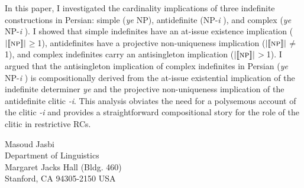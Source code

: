 \documentclass{salt}
\begin{document}
In this paper, I investigated the cardinality implications of three indefinite constructions in Persian: simple (\emph{ye} NP), antidefinite (NP-\emph{i} ), and complex (\emph{ye} NP-\emph{i} ). I showed that simple indefinites have an at-issue existence implication ($| \llbracket \textsc{np} \rrbracket |$$\geq$1), antidefinites have a projective non-uniqueness implication ($| \llbracket \textsc{np} \rrbracket |$$\not=$1), and complex indefinites carry an antisingleton implication ($| \llbracket \textsc{np} \rrbracket |$$>$1). I argued that the antisingleton implication of complex indefinites in Persian (\emph{ye} NP-\emph{i} ) is compositionally derived from the at-issue existential implication of the indefinite determiner \emph{ye} and the projective non-uniqueness implication of the antidefinite clitic \emph{-i}. This analysis obviates the need for a polysemous account of the clitic \emph{-i} and provides a straightforward compositional story for the role of the clitic in restrictive RCs.





\begin{addresses}
  \begin{address}
    Masoud Jasbi \\
    Department of Linguistics\\
    Margaret Jacks Hall (Bldg. 460)\\ 
    Stanford, CA 94305-2150 USA\\
  \end{address}
\end{addresses}

\end{document}
